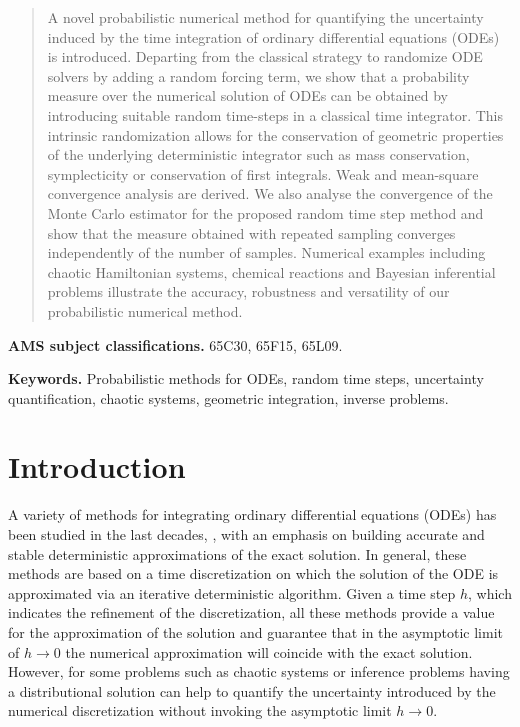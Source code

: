 \documentclass[10pt]{article}
\begin{document}
\maketitle	

\begin{abstract} 
A novel probabilistic numerical method for  quantifying the uncertainty induced by the time integration of ordinary differential equations (ODEs) is introduced. Departing from the classical strategy to randomize ODE solvers by adding a random forcing term, we show that a probability measure over the numerical solution of ODEs can be obtained by introducing suitable random time-steps in a classical time integrator.
This  intrinsic randomization allows for the conservation of geometric properties of the underlying deterministic integrator such as mass conservation, symplecticity or conservation of first integrals. Weak and mean-square convergence analysis are derived. We also analyse the convergence of the Monte Carlo estimator for the proposed random time step method and show that the measure obtained with repeated sampling converges  independently of the number of samples. Numerical examples including chaotic Hamiltonian systems, chemical reactions and Bayesian inferential problems illustrate the accuracy, robustness and versatility of our probabilistic numerical method.
\end{abstract}

\textbf{AMS subject classifications.} 65C30, 65F15, 65L09.

\textbf{Keywords.} Probabilistic methods for ODEs, random time steps, uncertainty quantification, chaotic systems, geometric integration, inverse problems.

\normalsize
\section{Introduction} 
A variety of methods for integrating ordinary differential equations (ODEs) has been studied in the last decades, \cite{HNW93, HaW96, HLW06}, with an emphasis on building accurate and stable deterministic approximations of the exact solution. In general, these methods are based on a time discretization on which the solution of the ODE is approximated via an iterative deterministic algorithm. Given a time step $h$, which indicates the refinement of the discretization, all these methods provide a  value for the approximation of the solution and guarantee that in the asymptotic limit of $h \to 0$ the numerical approximation will coincide with the exact solution. However, for some problems such as chaotic systems or inference problems having a distributional solution can help to quantify the uncertainty introduced by the numerical discretization without invoking the asymptotic limit $h \to 0$.
\end{document}
